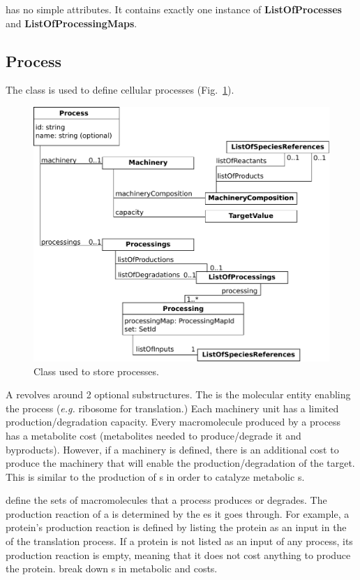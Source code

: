 \rbaprocesses{} has no simple attributes.
It contains exactly one instance of \textbf{ListOfProcesses}
and \textbf{ListOfProcessingMaps}.


\subsection{Process}
\label{sec:process}

The \process{} class is used to define cellular processes
(Fig.~\ref{fig:processes_process}).

\begin{figure}
  \centering
  \includegraphics[scale=0.8]{figures/processes_process}
  \caption{Class used to store processes.}
\label{fig:processes_process}
\end{figure}

A \process{} revolves around 2 optional substructures.
The \machinery{} is the molecular entity enabling the process
(\textit{e.g.} ribosome for translation.)
Each machinery unit has a limited production/degradation capacity.
Every macromolecule produced by a process has a metabolite cost
(metabolites needed to produce/degrade it and byproducts).
However, if a machinery is defined, there is an additional cost
to produce the machinery that will enable the production/degradation of the
target.
This is similar to the production of \enzyme{}s in order to catalyze
metabolic \reaction{}s.

\processings{} define the sets of macromolecules that a process
produces or degrades.
The production reaction of a \macromolecule{} is determined by the \process{}es
it goes through.
For example, a protein's production reaction is defined by listing
the protein as an input in the \processings{} of the translation process.
If a protein is not listed as an input of any process, its production reaction
is empty, meaning that it does not cost anything to produce the protein.
\processings{} break down \macromolecule{}s in metabolic \species{}
and \machinery{} costs.

